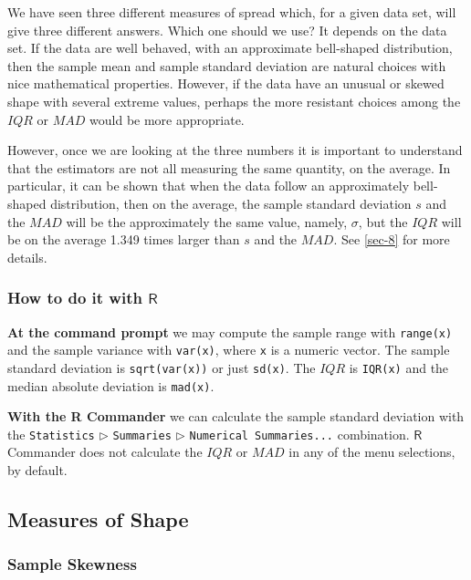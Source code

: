 \documentclass[captions=tableheading]{scrbook}
\begin{document}
We have seen three different measures of spread which, for a given data set, will give three different answers. Which one should we use? It depends on the data set. If the data are well behaved, with an approximate bell-shaped distribution, then the sample mean and sample standard deviation are natural choices with nice mathematical properties. However, if the data have an unusual or skewed shape with several extreme values, perhaps the more resistant choices among the \(IQR\) or \(MAD\) would be more appropriate.

However, once we are looking at the three numbers it is important to understand that the estimators are not all measuring the same quantity, on the average. In particular, it can be shown that when the data follow an approximately bell-shaped distribution, then on the average, the sample standard deviation \(s\) and the \(MAD\) will be the approximately the same value, namely, \(\sigma\), but the \(IQR\) will be on the average 1.349 times larger than \(s\) and the \(MAD\). See \ref{sec-8} for more details.
\subsubsection{How to do it with \(\mathsf{R}\)}
\label{sec-3-3-4-5}


\textbf{At the command prompt}
we may compute the sample range with \texttt{range(x)} and the sample variance with \texttt{var(x)}, where \texttt{x} is a numeric vector. The sample standard deviation is \texttt{sqrt(var(x))} or just \texttt{sd(x)}. The \(IQR\) is \texttt{IQR(x)} and the median absolute deviation is \texttt{mad(x)}.

\textbf{With the R Commander}
we can calculate the sample standard deviation with the \texttt{Statistics} \(\triangleright\) \texttt{Summaries} \(\triangleright\) \texttt{Numerical Summaries...} combination. \(\mathsf{R}\) Commander does not calculate the \(IQR\) or \(MAD\) in any of the menu selections, by default.
\subsection{Measures of Shape}
\label{sec-3-3-5}
\label{sub-Measures-of-Shape}
\subsubsection{Sample Skewness}
\label{sec-3-3-5-1}
\end{document}

